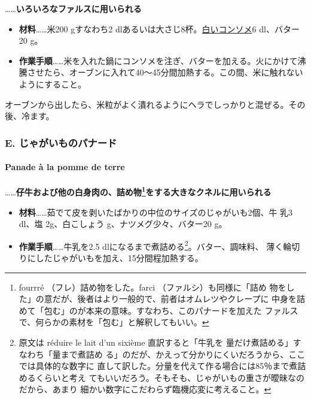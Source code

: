 \begin{recette}
\ldots{}\ldots{}\textbf{いろいろなファルスに用いられる}

\begin{itemize}
\item
  \textbf{材料}\ldots{}\ldots{}米200 gすなわち2
  dlあるいは大さじ8杯。\protect\hyperlink{}{白いコンソメ}6 dl、バター20
  g。
\item
  \textbf{作業手順}\ldots{}\ldots{}米を入れた鍋にコンソメを注ぎ、バターを加える。火にかけて沸騰させたら、オーブンに入れて40〜45分間加熱する。この間、米に触れないようにすること。
\end{itemize}

オーブンから出したら、米粒がよく潰れるようにヘラでしっかりと混ぜる。その後、冷ます。

\maeaki

\hypertarget{e.-ux3058ux3083ux304cux3044ux3082ux306eux30d1ux30caux30fcux30c9}{%
\subsubsection{E.
じゃがいものパナード}\label{e.-ux3058ux3083ux304cux3044ux3082ux306eux30d1ux30caux30fcux30c9}}

\hypertarget{panade-e}{%
\paragraph{Panade à la pomme de terre}\label{panade-e}}


\ldots{}\ldots{}\textbf{仔牛および他の白身肉の、詰め物\footnote{fourrré
  （フレ）詰め物をした。farci （ファルシ）も同様に「詰め
  物をした」の意だが、後者はより一般的で、前者はオムレツやクレープに
  中身を詰めて「包む」のが本来の意味。すなわち、このパナードを加えた
  ファルスで、何らかの素材を「包む」と解釈してもいい。}をする大きなクネルに用いられる}

\begin{itemize}
\item
  \textbf{材料}\ldots{}\ldots{}茹でて皮を剥いたばかりの中位のサイズのじゃがいも2個、牛
  乳3 dl、塩 2g、白こしょう\undemi{} g、ナツメグ少々、バター20 g。
\item
  \textbf{作業手順}\ldots{}\ldots{}牛乳を2.5
  dlになるまで煮詰める\footnote{原文は réduire le lait d'un sixième
    直訳すると「牛乳を
    \unsixieme{}量だけ煮詰める」すなわち「\cinqsixiemes{}量まで煮詰め
    る」のだが、かえって分かりにくいだろうから、ここでは具体的な数字に
    直して訳した。分量を代えて作る場合には85％まで煮詰めるくらいと考え
    てもいいだろう。そもそも、じゃがいもの重さが曖昧なのだから、あまり
    細かい数字にこだわらず臨機応変に考えること。}。バター、調味料、
  薄く輪切りにしたじゃがいもを加え、15分間程加熱する。
\end{itemize}


\end{recette}
